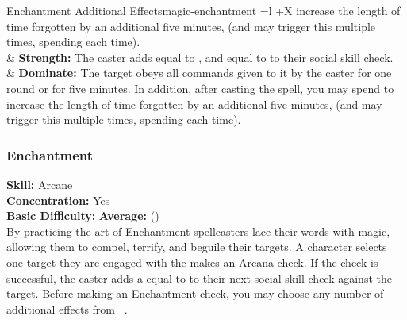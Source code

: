\begin{table*}[!htb]
\begin{GenesysTable}{Enchantment Additional Effects}{magic-enchantment}{ =l +X}
                            increase the length of time forgotten by an additional
                            five minutes, (and may trigger this multiple times,
                            spending \advantage each time).\\
\difficulty\difficulty  & \textbf{Strength:} The caster adds \success equal to \success,
                            and \advantage equal to \advantage to their social
                            skill check.\\
\difficulty\difficulty  & \textbf{Dominate:} The target obeys all commands given to it by
                            the caster for one round or for five minutes. In
                            addition, after casting the spell, you may spend \advantage
                            to increase the length of time forgotten by an
                            additional five minutes, (and may trigger this
                            multiple times, spending \advantage each time).\\
\end{GenesysTable}
\end{table*}

\subsubsection{Enchantment}
\textbf{Skill:} Arcane\\
\textbf{Concentration:} Yes\\
\textbf{Basic Difficulty:} \textbf{Average:} (\difficulty\difficulty)\\
By practicing the art of Enchantment spellcasters lace their words with magic,
allowing them to compel, terrify, and beguile their targets. A character selects
one target they are engaged with the makes an Arcana check. If the check is
successful, the caster adds a equal to \advantage to their next social skill
check against the target. Before making an Enchantment check, you may choose
any number of additional effects from ~.
